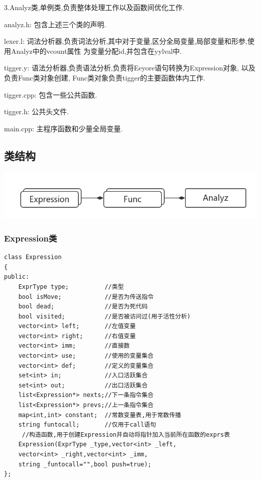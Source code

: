 \documentclass[UTF8]{article}
\begin{document}
	3.Analyz类,单例类,负责整体处理工作以及函数间优化工作. 

analyz.h: 包含上述三个类的声明.

lexer.l: 词法分析器,负责词法分析,其中对于变量,区分全局变量,局部变量和形参,使用Analyz中的vcount属性
为变量分配id,并包含在yylval中.

tigger.y: 语法分析器,负责语法分析,负责将Eeyore语句转换为Expression对象, 以及负责Func类对象创建, Func类对象负责tigger的主要函数体内工作.

tigger.cpp: 包含一些公共函数.

tigger.h: 公共头文件.

main.cpp: 主程序函数和少量全局变量.
\subsection{类结构}
\includegraphics[width=0.7\linewidth]{uml} 

\subsubsection{Expression类}
\begin{lstlisting}
class Expression
{
public:
    ExprType type;          //类型
    bool isMove;            //是否为传送指令
    bool dead;              //是否为死代码
    bool visited;           //是否被访问过(用于活性分析)
    vector<int> left;       //左值变量
    vector<int> right;      //右值变量
    vector<int> imm;        //直接数
    vector<int> use;        //使用的变量集合
    vector<int> def;        //定义的变量集合
    set<int> in;            //入口活跃集合
    set<int> out;           //出口活跃集合
    list<Expression*> nexts;//下一条指令集合
    list<Expression*> prevs;//上一条指令集合
    map<int,int> constant;  //常数变量表,用于常数传播
    string funtocall;       //仅用于call语句
     //构造函数,用于创建Expression并自动将指针加入当前所在函数的exprs表
    Expression(ExprType _type,vector<int> _left,
    vector<int> _right,vector<int> _imm,
    string _funtocall="",bool push=true);
};
\end{lstlisting}
\end{document}
